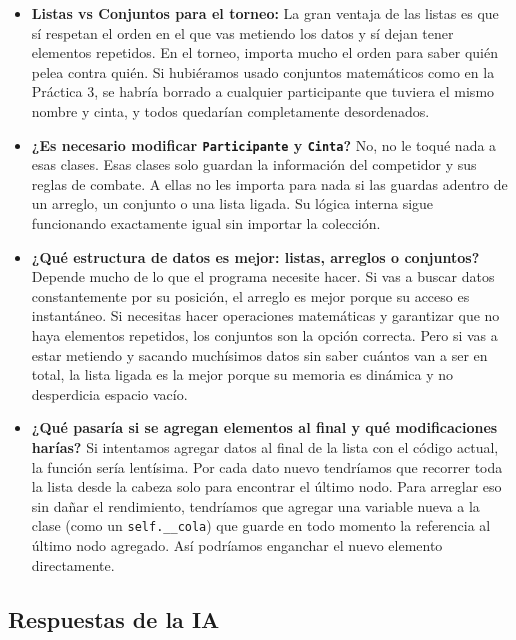 \documentclass[12pt, letterpaper]{article}
\begin{document}
\begin{itemize}
    \item[\textbf{a)}] \textbf{Listas vs Conjuntos para el torneo:}
La gran ventaja de las listas es que sí respetan el orden en el que vas metiendo los datos y sí dejan tener elementos repetidos. En el torneo, importa mucho el orden para saber quién pelea contra quién. Si hubiéramos usado conjuntos matemáticos como en la Práctica 3, se habría borrado a cualquier participante que tuviera el mismo nombre y cinta, y todos quedarían completamente desordenados.
    \item[\textbf{b)}] \textbf{¿Es necesario modificar \texttt{Participante} y \texttt{Cinta}?}
No, no le toqué nada a esas clases. Esas clases solo guardan la información del competidor y sus reglas de combate. A ellas no les importa para nada si las guardas adentro de un arreglo, un conjunto o una lista ligada. Su lógica interna sigue funcionando exactamente igual sin importar la colección.

    \item[\textbf{c)}] \textbf{¿Qué estructura de datos es mejor: listas, arreglos o conjuntos?}
    Depende mucho de lo que el programa necesite hacer. Si vas a buscar datos constantemente por su posición, el arreglo es mejor porque su acceso es instantáneo. Si necesitas hacer operaciones matemáticas y garantizar que no haya elementos repetidos, los conjuntos son la opción correcta. Pero si vas a estar metiendo y sacando muchísimos datos sin saber cuántos van a ser en total, la lista ligada es la mejor porque su memoria es dinámica y no desperdicia espacio vacío.
    
    \item[\textbf{d)}] \textbf{¿Qué pasaría si se agregan elementos al final y qué modificaciones harías?}
    Si intentamos agregar datos al final de la lista con el código actual, la función sería lentísima. Por cada dato nuevo tendríamos que recorrer toda la lista desde la cabeza solo para encontrar el último nodo. Para arreglar eso sin dañar el rendimiento, tendríamos que agregar una variable nueva a la clase (como un \texttt{self.\_\_cola}) que guarde en todo momento la referencia al último nodo agregado. Así podríamos enganchar el nuevo elemento directamente.
\end{itemize}


\subsection*{Respuestas de la IA}
\end{document}
